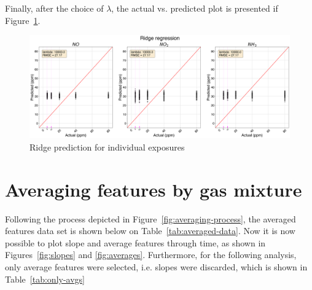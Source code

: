 Finally, after the choice of $\lambda$, the actual vs. predicted plot is presented if Figure~\ref{fig:ridge-exposures}.

\begin{figure}[h]
	\centering
	\includegraphics[width=1\textwidth]{../figures/ridge-exposures.png}
	\caption{Ridge prediction for individual exposures}
	\label{fig:ridge-exposures}
\end{figure}

\newpage
\section{Averaging features by gas mixture}

Following the process depicted in Figure~\ref{fig:averaging-process}, the averaged features data set is shown below on Table~\ref{tab:averaged-data}. Now it is now possible to plot slope and average features through time, as shown in Figures~\ref{fig:slopes} and \ref{fig:averages}. Furthermore, for the following analysis, only average features were selected, i.e. slopes were discarded, which is shown in Table~\ref{tab:only-avgs}



